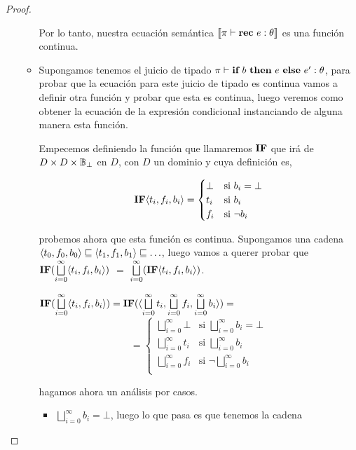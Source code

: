\begin{proof}
\begin{itemize}
\begin{itemize}
Por lo tanto, nuestra ecuaci\'on sem\'antica $\llbracket \pi \vdash \textbf{rec} \ e : \theta \rrbracket$ es
una funci\'on continua.

\item Supongamos tenemos el juicio de tipado $\pi \vdash \textbf{if} \ b \ \textbf{then} \ e \ \textbf{else} \ e' : \theta$, para
probar que la ecuaci\'on para este juicio de tipado es continua vamos a definir otra funci\'on
y probar que esta es continua, luego veremos como obtener la ecuaci\'on de la expresi\'on 
condicional instanciando de alguna manera esta funci\'on.

Empecemos definiendo la funci\'on que llamaremos $\textbf{IF}$ que ir\'a de $D \times D \times \mathbb{B}_\bot$ en
$D$, con $D$ un dominio y cuya definici\'on es,

\[
\textbf{IF} \langle t_i,f_i,b_i \rangle=
\begin{cases}
\bot & \text{si } b_i = \bot \\
t_i  & \text{si } b_i\\
f_i  & \text{si } \neg b_i\\
\end{cases}
\]

probemos ahora que esta funci\'on es continua. Supongamos una cadena 
$\langle t_0,f_0,b_0 \rangle \sqsubseteq \langle t_1,f_1,b_1 \rangle \sqsubseteq \ldots$, luego
vamos a querer probar que $\textbf{IF} (\bigsqcup\limits^{\infty}_{i=0}\langle t_i,f_i,b_i \rangle)$ $=$
$\bigsqcup\limits^{\infty}_{i=0} (\textbf{IF} \langle t_i,f_i,b_i \rangle)$.


$\textbf{IF} (\bigsqcup\limits^{\infty}_{i=0}\langle t_i,f_i,b_i \rangle) =
\textbf{IF} (\langle \bigsqcup\limits^{\infty}_{i=0}t_i
    ,\bigsqcup\limits^{\infty}_{i=0}f_i
    ,\bigsqcup\limits^{\infty}_{i=0}b_i \rangle) =$
\[
=
\begin{cases}
\bigsqcup\limits^{\infty}_{i=0} \bot & \text{si } \bigsqcup\limits^{\infty}_{i=0}b_i = \bot \\
\bigsqcup\limits^{\infty}_{i=0}t_i & \text{si } \bigsqcup\limits^{\infty}_{i=0}b_i\\
\bigsqcup\limits^{\infty}_{i=0}f_i & \text{si } \neg \bigsqcup\limits^{\infty}_{i=0}b_i\\
\end{cases}
\]

hagamos ahora un an\'alisis por casos.

\begin{itemize}
\item $\bigsqcup\limits^{\infty}_{i=0}b_i = \bot$, luego lo que pasa es que tenemos
la cadena \\


\end{itemize}
\end{itemize}
\end{itemize}
\end{proof}

